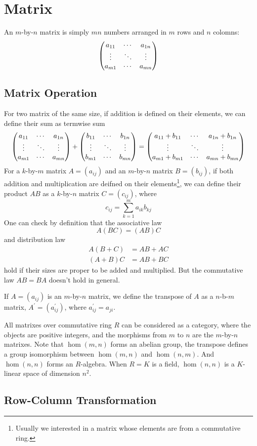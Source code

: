 \section{Matrix}
An $m$-by-$n$ matrix is simply $mn$ numbers arranged in $m$ rows and $n$ colomns:
$$\left(\begin{matrix}
a_{11} & \cdots & a_{1n} \cr
\vdots & \ddots & \vdots \cr
a_{m1} & \cdots & a_{mn}
\end{matrix}\right)$$

\subsection{Matrix Operation}
For two matrix of the same size, if addition is defined on their elements,
we can define their sum as termwise sum
$$\left(\begin{matrix}
a_{11} & \cdots & a_{1n} \cr
\vdots & \ddots & \vdots \cr
a_{m1} & \cdots & a_{mn}
\end{matrix}\right) +
\left(\begin{matrix}
b_{11} & \cdots & b_{1n} \cr
\vdots & \ddots & \vdots \cr
b_{m1} & \cdots & b_{mn}
\end{matrix}\right) 
=\left(\begin{matrix}
a_{11} + b_{11} & \cdots & a_{1n} + b_{1n} \cr
\vdots & \ddots & \vdots \cr
a_{m1} + b_{m1} & \cdots & a_{mn} + b_{mn}
\end{matrix}\right)$$
For a $k$-by-$m$ matrix $A = (a_{ij})$ and an $m$-by-$n$ matrix $B = (b_{ij})$,
if both addition and multiplication are deifned on their elements\footnote{
Usually we interested in a matrix whose elements are from a commutative ring.},
we can define their product $AB$ as a $k$-by-$n$ matrix $C = (c_{ij})$, where
$$c_{ij} = \sum_{k=1}^m a_{ik}b_{kj}$$
One can check by definition that the associative law $$A(BC) = (AB)C$$ 
and distribution law 
\begin{align*}
A(B + C) &= AB + AC \\
(A + B)C &= AB + BC
\end{align*}
hold if their sizes are proper to be added and multiplied.
But the commutative law $AB = BA$ doesn't hold in general.

If $A = (a_{ij})$ is an $m$-by-$n$ matrix,
we define the transpose of $A$ as a $n$-b-$m$ matrix,
$A^\prime = (a^\prime_{ij})$, where $a^\prime_{ij} = a_{ji}$.

\begin{rem}
All matrixes over commutative ring $R$ can be considered as a category,
where the objects are positive integers, and the morphisms from $m$ to $n$ are 
the $m$-by-$n$ matrixes. Note that $\hom(m, n)$ forms an abelian group, the 
transpose defines a group isomorphism between $\hom(m, n)$ and $\hom(n, m)$.
And $\hom(n, n)$ forms an $R$-algebra. When $R = K$ is a field, $\hom(n, n)$
is a $K$-linear space of dimension $n^2$.
\end{rem}

\subsection{Row-Column Transformation}
